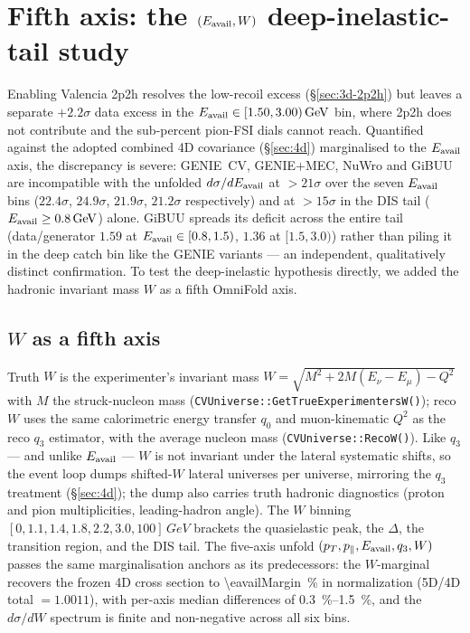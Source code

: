 \section{Fifth axis: the $(\Eavail,W)$ deep-inelastic-tail study}
\label{sec:eavailw}

Enabling Valencia 2p2h resolves the low-recoil excess (\S\ref{sec:3d-2p2h})
but leaves a separate $+2.2\sigma$ data excess in the
$\Eavail\in[1.50,3.00)\,\si{GeV}$ bin, where 2p2h does not contribute and the
sub-percent pion-FSI dials cannot reach. Quantified against the adopted
combined 4D covariance (\S\ref{sec:4d}) marginalised to the $\Eavail$ axis,
the discrepancy is severe: GENIE~CV, GENIE$+$MEC, NuWro and GiBUU are
incompatible with the unfolded $d\sigma/d\Eavail$ at $>21\sigma$ over the
seven $\Eavail$ bins ($22.4\sigma$, $24.9\sigma$, $21.9\sigma$, $21.2\sigma$
respectively) and at $>15\sigma$ in the DIS tail
($\Eavail\ge\SI{0.8}{GeV}$) alone. GiBUU spreads its deficit across the entire
tail (data/generator $1.59$ at $\Eavail\in[0.8,1.5)$, $1.36$ at $[1.5,3.0)$)
rather than piling it in the deep catch bin like the GENIE variants --- an
independent, qualitatively distinct confirmation. To test the deep-inelastic
hypothesis directly, we added the hadronic invariant mass $W$ as a fifth
OmniFold axis.

\subsection{$W$ as a fifth axis}
\label{sec:eavailw-axis}
Truth $W$ is the experimenter's invariant mass
$W=\sqrt{M^{2}+2M(E_\nu-E_\mu)-Q^{2}}$ with $M$ the struck-nucleon mass
(\texttt{CVUniverse::GetTrueExperimentersW()}); reco $W$ uses the same
calorimetric energy transfer $q_{0}$ and muon-kinematic $Q^{2}$ as the reco
$q_{3}$ estimator, with the average nucleon mass
(\texttt{CVUniverse::RecoW()}). Like $q_{3}$ --- and unlike $\Eavail$ --- $W$
is not invariant under the lateral systematic shifts, so the event loop dumps
shifted-$W$ lateral universes per universe, mirroring the $q_{3}$ treatment
(\S\ref{sec:4d}); the dump also carries truth hadronic diagnostics (proton and
pion multiplicities, leading-hadron angle). The $W$
binning $[0,1.1,1.4,1.8,2.2,3.0,100]\,\si{GeV}$ brackets the quasielastic
peak, the $\Delta$, the transition region, and the DIS tail. The five-axis
unfold $(\pT,\pPar,\Eavail,q_{3},W)$ passes the same marginalisation anchors
as its predecessors: the $W$-marginal recovers the frozen 4D cross section to
\SI{\eavailMargin}{\percent} in normalization (5D/4D total $=1.0011$), with per-axis
median differences of \SIrange{0.3}{1.5}{\percent}, and the
$d\sigma/dW$ spectrum is finite and non-negative across all six bins.

